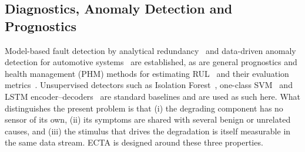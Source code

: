 \subsection{Diagnostics, Anomaly Detection and Prognostics}
Model-based fault detection by analytical redundancy~\cite{chow1984} and
data-driven anomaly detection for automotive systems~\cite{theissler2017}
are established, as are general prognostics and health management (PHM)
methods for estimating RUL~\cite{si2011,lei2018} and their evaluation
metrics~\cite{saxena2010}. Unsupervised detectors such as Isolation
Forest~\cite{iforest}, one-class SVM~\cite{ocsvm} and LSTM
encoder--decoders~\cite{malhotra2016} are standard baselines and are used as
such here. What distinguishes the present problem is that (i) the degrading
component has no sensor of its own, (ii) its symptoms are shared with
several benign or unrelated causes, and (iii) the stimulus that drives the
degradation is itself measurable in the same data stream. ECTA is designed
around these three properties.
